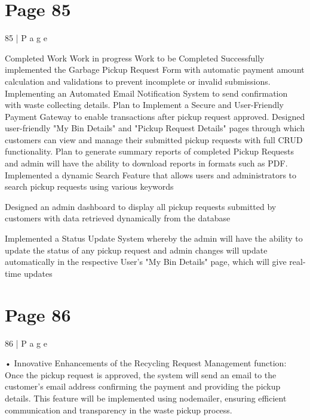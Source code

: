 \documentclass{article}
\begin{document}
 

\section*{Page 85}
85 | P a g e 
 
 
 
Completed Work Work in progress Work to be Completed 
Successfully implemented 
the Garbage Pickup 
Request Form with 
automatic payment amount 
calculation and validations 
to prevent incomplete or 
invalid submissions. 
Implementing an 
Automated Email 
Notification System to send 
confirmation with waste 
collecting details. 
Plan to Implement a Secure 
and User-Friendly Payment 
Gateway to enable 
transactions after pickup 
request approved. 
Designed user-friendly "My 
Bin Details" and "Pickup 
Request Details" pages 
through which customers 
can view and manage their 
submitted pickup requests 
with full CRUD 
functionality. 
 Plan to generate summary 
reports of completed 
Pickup Requests and admin 
will have the ability to 
download reports in 
formats such as PDF. 
Implemented a dynamic 
Search Feature that allows 
users and administrators to 
search pickup requests 
using various keywords 
  
Designed an admin 
dashboard to display all 
pickup requests submitted 
by customers with data 
retrieved dynamically from 
the database 
  
Implemented a Status 
Update System whereby the 
admin will have the ability 
to update the status of any 
pickup request and admin 
changes will update 
automatically in the 
respective User's "My Bin 
Details" page, which will 
give real-time updates 
  
 
 

\section*{Page 86}
86 | P a g e 
 
 
 
 
 
 
 
 
 
 
• Innovative Enhancements of the Recycling Request Management function: 
Once the pickup request is approved, the system will send an email to the customer’s 
email address confirming the payment and providing the pickup details. This feature will 
be implemented using nodemailer, ensuring efficient communication and transparency in 
the waste pickup process. 
 
\end{document}
